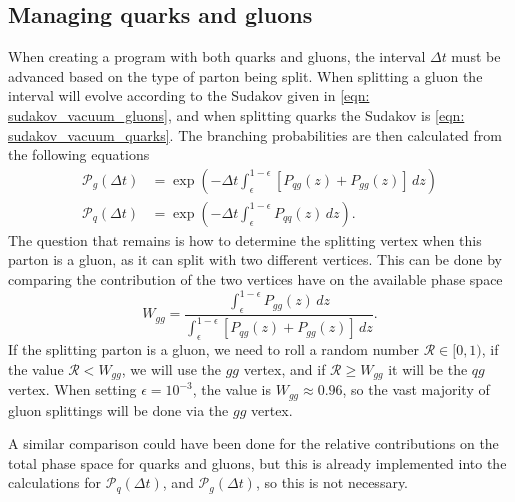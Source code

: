 \documentclass[main.tex]{subfiles}
\begin{document}
\subsection{Managing quarks and gluons}\label{sec: managing_quarks_and_gluons}
When creating a program with both quarks and gluons, the interval \(\Delta t\) must be advanced based on the type of parton being split. When splitting a gluon the interval will evolve according to the Sudakov given in \autoref{eqn: sudakov_vacuum_gluons}, and when splitting quarks the Sudakov is \autoref{eqn: sudakov_vacuum_quarks}. The branching probabilities are then calculated from the following equations
\begin{align}
    \mathcal{P}_{g}(\Delta t) &= \exp\left(-\Delta t \int_\epsilon^{1-\epsilon} \left[ P_{qg}(z) + P_{gg}(z) \right] \, dz \right)  \label{eqn: sudakov_splitting_interval_gluons}  \\
    \mathcal{P}_{q}(\Delta t) &= \exp\left(-\Delta t \int_\epsilon^{1-\epsilon} P_{qq}(z) \, dz \right). \label{eqn: sudakov_splitting_interval_quarks}
\end{align}
The question that remains is how to determine the splitting vertex when this parton is a gluon, as it can split with two different vertices. This can be done by comparing the contribution of the two vertices have on the available phase space
\begin{equation}\label{eqn: gluon_splitting_selection_ratios}
    W_{gg} = \frac{\int_\epsilon^{1-\epsilon} P_{gg}(z) \, dz}{\int_\epsilon^{1-\epsilon} \left[P_{qg}(z) + P_{gg}(z) \right]\, dz}.
\end{equation}
If the splitting parton is a gluon, we need to roll a random number \(\mathcal{R}\in[0,1)\), if the value \(\mathcal{R}< W_{gg}\), we will use the \(gg\) vertex, and if \(\mathcal{R}\geq W_{gg}\) it will be the \(qg\) vertex. When setting \(\epsilon = 10^{-3}\), the value is \(W_{gg} \approx 0.96\), so the vast majority of gluon splittings will be done via the \(gg\) vertex.

A similar comparison could have been done for the relative contributions on the total phase space for quarks and gluons, but this is already implemented into the calculations for \(\mathcal{P}_q(\Delta t)\), and \(\mathcal{P}_g(\Delta t)\), so this is not necessary. 
\end{document}
